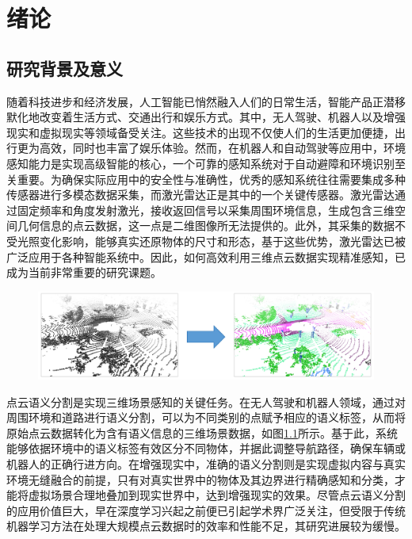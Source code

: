 \chapter{绪论}
\thispagestyle{others}
\pagestyle{others}
\xiaosi

\section{研究背景及意义}
    随着科技进步和经济发展，人工智能已悄然融入人们的日常生活，智能产品正潜移默化地改变着生活方式、交通出行和娱乐方式。其中，无人驾驶、机器人以及增强现实和虚拟现实等领域备受关注。这些技术的出现不仅使人们的生活更加便捷，出行更为高效，同时也丰富了娱乐体验。然而，在机器人和自动驾驶等应用中，环境感知能力是实现高级智能的核心，一个可靠的感知系统对于自动避障和环境识别至关重要。为确保实际应用中的安全性与准确性，优秀的感知系统往往需要集成多种传感器进行多模态数据采集，而激光雷达正是其中的一个关键传感器。激光雷达通过固定频率和角度发射激光，接收返回信号以采集周围环境信息，生成包含三维空间几何信息的点云数据，这一点是二维图像所无法提供的。此外，其采集的数据不受光照变化影响，能够真实还原物体的尺寸和形态，基于这些优势，激光雷达已被广泛应用于各种智能系统中。因此，如何高效利用三维点云数据实现精准感知，已成为当前非常重要的研究课题。
    \begin{figure}[H]
        \centering
        \includegraphics[width = \textwidth]{ljx/figure/1-1.pdf}
        \label{fig:1-1}
    \end{figure}
    点云语义分割是实现三维场景感知的关键任务。在无人驾驶和机器人领域，通过对周围环境和道路进行语义分割，可以为不同类别的点赋予相应的语义标签，从而将原始点云数据转化为含有语义信息的三维场景数据，如图\ref{fig:1-1}所示。基于此，系统能够依据环境中的语义标签有效区分不同物体，并据此调整导航路径，确保车辆或机器人的正确行进方向。在增强现实中，准确的语义分割则是实现虚拟内容与真实环境无缝融合的前提，只有对真实世界中的物体及其边界进行精确感知和分类，才能将虚拟场景合理地叠加到现实世界中，达到增强现实的效果。尽管点云语义分割的应用价值巨大，早在深度学习兴起之前便已引起学术界广泛关注，但受限于传统机器学习方法在处理大规模点云数据时的效率和性能不足，其研究进展较为缓慢。

